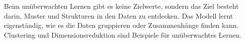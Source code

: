Beim unüberwachten Lernen gibt es keine Zielwerte, sondern das Ziel besteht
darin, Muster und Strukturen in den Daten zu entdecken. Das Modell lernt
eigenständig, wie es die Daten gruppieren oder Zusammenhänge finden kann.
Clustering und Dimensionsreduktion sind Beispiele für unüberwachtes Lernen.